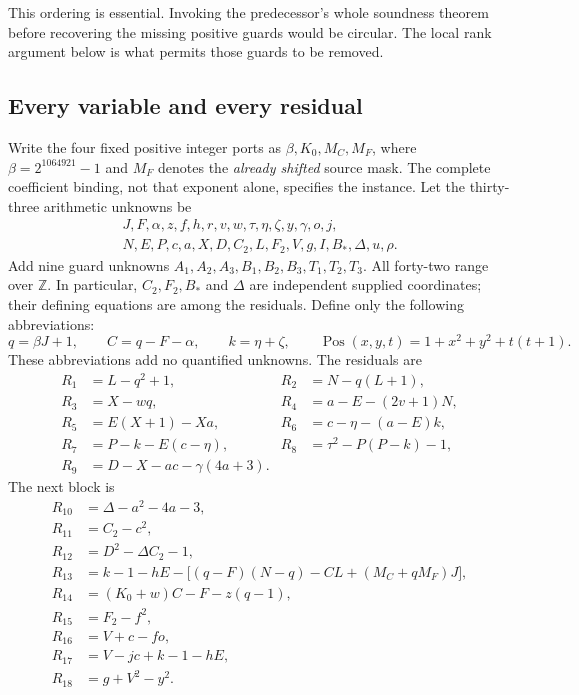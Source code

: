 This ordering is essential. Invoking the predecessor's whole soundness
theorem before recovering the missing positive guards would be circular.
The local rank argument below is what permits those guards to be removed.

\subsection{Every variable and every residual}

Write the four fixed positive integer ports as
$\beta,K_0,M_C,M_F$, where $\beta=2^{1064921}-1$ and $M_F$ denotes the
\emph{already shifted} source mask. The complete coefficient binding, not
that exponent alone, specifies the instance. Let the thirty-three
arithmetic unknowns be
\begin{gather*}
 J,F,\alpha,z,f,h,r,v,w,\tau,\eta,\zeta,y,\gamma,o,j,\\
 N,E,P,c,a,X,D,C_2,L,F_2,V,g,I,B_*,\Delta,u,\rho.
\end{gather*}
Add nine guard unknowns $A_1,A_2,A_3,B_1,B_2,B_3,T_1,T_2,T_3$.
All forty-two range over $\mathbb Z$. In particular, $C_2,F_2,B_*$ and
$\Delta$ are independent supplied coordinates; their defining equations
are among the residuals. Define only the following abbreviations:
\[
 q=\beta J+1,\qquad C=q-F-\alpha,\qquad k=\eta+\zeta,
 \qquad \operatorname{Pos}(x,y,t)=1+x^2+y^2+t(t+1).
\]
These abbreviations add no quantified unknowns. The residuals are
\begin{align}
 R_1&=L-q^2+1, &
 R_2&=N-q(L+1), \nonumber\\
 R_3&=X-wq, &
 R_4&=a-E-(2v+1)N, \nonumber\\
 R_5&=E(X+1)-Xa, &
 R_6&=c-\eta-(a-E)k, \nonumber\\
 R_7&=P-k-E(c-\eta), &
 R_8&=\tau^2-P(P-k)-1, \nonumber\\
 R_9&=D-X-ac-\gamma(4a+3). &&
 \label{eq:q42-block1}
\end{align}
The next block is
\begin{align}
 R_{10}&=\Delta-a^2-4a-3, \nonumber\\
 R_{11}&=C_2-c^2, \nonumber\\
 R_{12}&=D^2-\Delta C_2-1, \nonumber\\
 R_{13}&=k-1-hE
       -\bigl[(q-F)(N-q)-CL+(M_C+qM_F)J\bigr], \nonumber\\
 R_{14}&=(K_0+w)C-F-z(q-1), \nonumber\\
 R_{15}&=F_2-f^2, \nonumber\\
 R_{16}&=V+c-fo, \nonumber\\
 R_{17}&=V-jc+k-1-hE, \nonumber\\
 R_{18}&=g+V^2-y^2.
 \label{eq:q42-block2}
\end{align}
